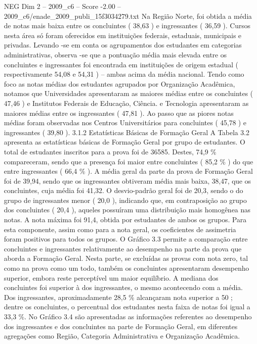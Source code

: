 \begin{textsample}{NEG Dim 2 – 2009\_c6 – Score -2.00 – 2009\_c6/enade\_2009\_publi\_15f3034279.txt}
Na Região Norte, foi obtida a média de notas mais baixa entre os concluintes ( 38,63 ) e ingressantes ( 36,59 ).
Cursos nesta área só foram oferecidos em instituições federais, estaduais, municipais e privadas.
Levando -se em conta os agrupamentos dos estudantes em categorias administrativas, observa -se que a pontuação média mais elevada entre os concluintes e ingressantes foi encontrada em instituições de origem estadual ( respectivamente 54,08 e 54,31 ) – ambas acima da média nacional.
Tendo como foco as notas médias dos estudantes agrupados por Organização Acadêmica, notamos que Universidades apresentaram as maiores médias entre os concluintes ( 47,46 ) e Institutos Federais de Educação, Ciência. e Tecnologia apresentaram as maiores médias entre os ingressantes ( 47,81 ).
Ao passo que as piores notas médias foram observadas nos Centros Universitários para concluintes ( 45,78 ) e ingressantes ( 39,80 ). 3.1.2 Estatísticas Básicas de Formação Geral A Tabela 3.2 apresenta as estatísticas básicas de Formação Geral por grupo de estudantes.
O total de estudantes inscritos para a prova foi de 36585.
Destes, 74,9 \% compareceram, sendo que a presença foi maior entre concluintes ( 85,2 \% ) do que entre ingressantes ( 66,4 \% ).
A média geral da parte da prova de Formação Geral foi de 39,94, sendo que os ingressantes obtiveram média mais baixa, 38,47, que os concluintes, cuja média foi 41,32.
O desvio-padrão geral foi de 20,3, sendo o do grupo de ingressantes menor ( 20,0 ), indicando que, em contraposição ao grupo dos concluintes ( 20,4 ), aqueles possuíram uma distribuição mais homogênea nas notas.
A nota máxima foi 91,4, obtida por estudantes de ambos os grupos.
Para esta componente, assim como para a nota geral, os coeficientes de assimetria foram positivos para todos os grupos.
O Gráfico 3.3 permite a comparação entre concluintes e ingressantes relativamente ao desempenho na parte da prova que aborda a Formação Geral.
Nesta parte, se excluídas as provas com nota zero, tal como na prova como um todo, também os concluintes apresentaram desempenho superior, embora reste perceptível um maior equilíbrio.
A mediana dos concluintes foi superior à dos ingressantes, o mesmo acontecendo com a média.
Dos ingressantes, aproximadamente 28,5 \% alcançaram nota superior a 50 ; dentre os concluintes, o percentual dos estudantes nesta faixa de notas foi igual a 33,3 \%.
No Gráfico 3.4 são apresentadas as informações referentes ao desempenho dos ingressantes e dos concluintes na parte de Formação Geral, em diferentes agregações como Região, Categoria Administrativa e Organização Acadêmica.

\end{textsample}
